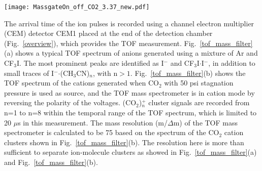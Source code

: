 \documentclass[%
aip,
rsi,
 amsmath,amssymb,
reprint,%
]{revtex4-1}
\begin{document}
\begin{figure*}
\centering
\texttt{[image: MassgateOn\_off\_CO2\_3.37\_new.pdf]}
\caption{TOF spectrum for (a) anions created from a gas mixture of Ar and CF$_3$I, without the mass filter, and (b) TOF spectrum of cations generated when CO$_2$ is used as source, without the mass filter. Blue dashed vertical lines indicate the (CO$_2$)$_n^+$ cation clusters from n=1 to n=8. (c) Same conditions as (a), but with the mass filter selecting the anion-molecule cluster CF$_3$I$\cdot$I$^-$. (d) Same conditions as (b), but with the mass filter selecting the cation cluster (CO$_2$)$_2^+$.}
\label{tof_mass_filter}
\end{figure*} 

The arrival time of the ion pulses is recorded using a channel electron multiplier (CEM) detector CEM1 placed at the end of the detection chamber (Fig.~\ref{overview}), which provides the TOF measurement. Fig.~\ref{tof_mass_filter}(a) shows a typical TOF spectrum of anions generated using a mixture of Ar and CF$_3$I. The most prominent peaks are identified as I$^-$ and CF$_3$I$\cdot$I$^-$, in addition to small traces of I$^-$$\cdot$(CH$_3$CN)$_n$, with n$>1$. Fig.~\ref{tof_mass_filter}(b) shows the TOF spectrum of the cations generated when CO$_2$ with 50 psi stagnation pressure is used as source, and the TOF mass spectrometer is in cation mode by reversing the polarity of the voltages. (CO$_2$)$_n^+$ cluster signals are recorded from n=1 to n=8 within the temporal range of the TOF spectrum, which is limited to 20 $\mu$s in this measurement. The mass resolution (m/$\Delta$m) of the TOF mass spectrometer is calculated to be 75 based on the spectrum of the CO$_2$ cation clusters shown in Fig.~\ref{tof_mass_filter}(b). The resolution here is more than sufficient to separate ion-molecule clusters as showed in Fig.~\ref{tof_mass_filter}(a) and Fig.~\ref{tof_mass_filter}(b).
\end{document}
